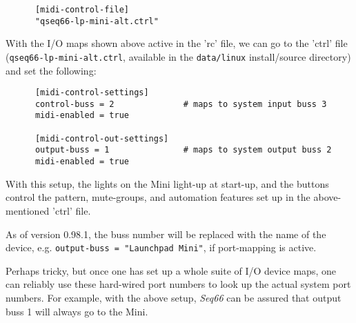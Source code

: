    \begin{verbatim}
      [midi-control-file]
      "qseq66-lp-mini-alt.ctrl"
   \end{verbatim}

   With the I/O maps shown above active in the 'rc' file,
   we can go to the 'ctrl' file (\texttt{qseq66-lp-mini-alt.ctrl}, available in
   the \texttt{data/linux} install/source directory)
   and set the following:

   \begin{verbatim}
      [midi-control-settings]
      control-buss = 2              # maps to system input buss 3
      midi-enabled = true

      [midi-control-out-settings]
      output-buss = 1               # maps to system output buss 2
      midi-enabled = true
   \end{verbatim}

   With this setup, the lights on the Mini light-up at start-up, and the
   buttons control the pattern, mute-groups, and automation features set up in
   the above-mentioned 'ctrl' file.
   
   As of version 0.98.1, the buss number will be replaced with the name of the
   device, e.g. \texttt{output-buss = "Launchpad Mini"}, if port-mapping
   is active.

   Perhaps tricky, but once one has set up a whole suite of I/O device maps,
   one can reliably use these hard-wired port numbers to look up the actual
   system port numbers.  For example, with the above setup, \textsl{Seq66} can
   be assured that output buss 1 will always go to the Mini.

